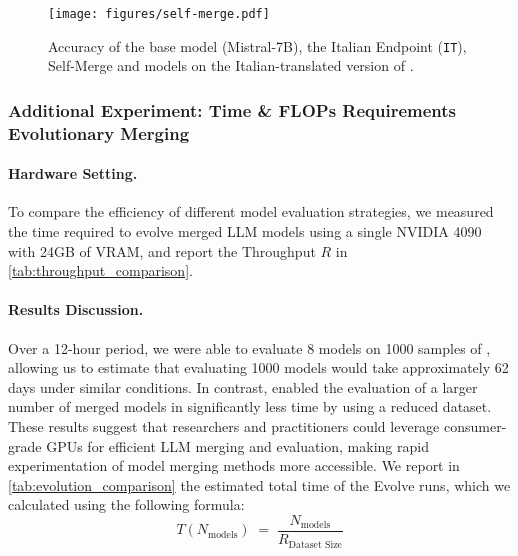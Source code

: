 \begin{figure}
    \centering
    \texttt{[image: figures/self-merge.pdf]}
    \caption{Accuracy of the base model (Mistral-7B), the Italian Endpoint (\texttt{IT}), Self-Merge and \approach models on the Italian-translated version of .}
    \label{fig:self-merge}
\end{figure}

\subsubsection{Additional Experiment: Time \& FLOPs Requirements Evolutionary Merging}
\label{app:add-exp-4090}
\paragraph{Hardware Setting.} To compare the efficiency of different model evaluation strategies, we measured the time required to evolve merged LLM models using a single NVIDIA 4090 with 24GB of VRAM, and report the Throughput $R$ in \cref{tab:throughput_comparison}. 

\paragraph{Results Discussion.} Over a 12-hour period, we were able to evaluate 8 models on 1000 samples of , allowing us to estimate that evaluating 1000 models would take approximately 62 days under similar conditions. In contrast, \approach enabled the evaluation of a larger number of merged models in significantly less time by using a reduced dataset. These results suggest that researchers and practitioners could leverage consumer-grade GPUs for efficient LLM merging and evaluation, making rapid experimentation of model merging methods more accessible. We report in \cref{tab:evolution_comparison} the estimated total time of the Evolve runs, which we calculated using the following formula:
%
\[
T(N_{\text{models}}) \;=\; \frac{N_{\text{models}}}{R_{\text{Dataset Size}}}
\]
%
\begin{table}[h]
    \centering
    \caption{Throughput (\( R \)) in models per hour for different sample sizes per fitness evaluation on . These estimates are based on 12-hour Evolve runs on a single NVIDIA 4090 with 24GB of VRAM.}
    \label{tab:throughput_comparison}
    \vspace{10pt}
\end{table}

